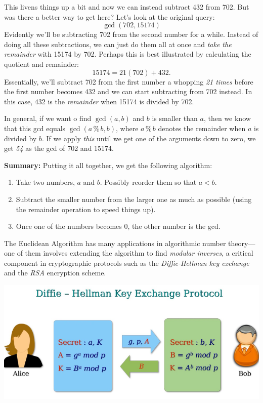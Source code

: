 \documentclass{article}
\begin{document}
This livens things up a bit and now we can instead subtract 432 from 702. But was there a better way to get here? Let's look at the original query:
$$\gcd(702, 15174)$$
Evidently we'll be subtracting 702 from the second number for a while. Instead of doing all these subtractions, we can just do them all at once and \textit{take the remainder} with 15174 by 702. Perhaps this is best illustrated by calculating the quotient and remainder:
$$15174 = 21(702) + 432.$$
Essentially, we'll subtract 702 from the first number a whopping \textit{21 times} before the first number becomes 432 and we can start subtracting from 702 instead. In this case, 432 is the \textit{remainder} when 15174 is divided by 702.

In general, if we want o find $\gcd(a, b)$ and $b$ is smaller than $a$, then we know that this gcd equals $\gcd(a\,\%\,b, b)$, where $a\,\%\,b$ denotes the remainder when $a$ is divided by $b$. If we apply \textit{this} until we get one of the arguments down to zero, we get \textit{54} as the gcd of 702 and 15174.

\textbf{Summary:} Putting it all together, we get the following algorithm:
\begin{enumerate}
\item Take two numbers, $a$ and $b$. Possibly reorder them so that $a < b$.
\item Subtract the smaller number from the larger one as much as possible (using the remainder operation to speed things up).
\item Once one of the numbers becomes 0, the other number is the gcd.
\end{enumerate}
The Euclidean Algorithm has many applications in algorithmic number theory—one of them involves extending the algorithm to find \textit{modular inverses}, a critical component in cryptographic protocols such as the \textit{Diffie-Hellman key exchange} and the \textit{RSA} encryption scheme.
\begin{center}
\includegraphics[scale=0.4]{images/diffie_hellman.png}
\end{center}
\end{document}
